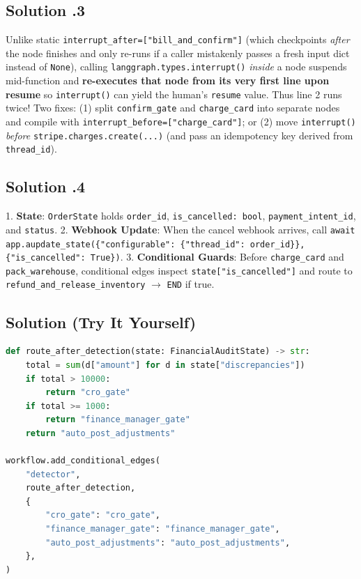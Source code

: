 \subsection*{Solution \thechapter.3}
Unlike static \texttt{interrupt\_after=["bill\_and\_confirm"]} (which checkpoints \emph{after} the node finishes and only re-runs if a caller mistakenly passes a fresh input dict instead of \texttt{None}), calling \texttt{langgraph.types.interrupt()} \emph{inside} a node suspends mid-function and \textbf{re-executes that node from its very first line upon resume} so \texttt{interrupt()} can yield the human's \texttt{resume} value. Thus line 2 runs twice! Two fixes: (1) split \texttt{confirm\_gate} and \texttt{charge\_card} into separate nodes and compile with \texttt{interrupt\_before=["charge\_card"]}; or (2) move \texttt{interrupt()} \emph{before} \texttt{stripe.charges.create(...)} (and pass an idempotency key derived from \texttt{thread\_id}).

\subsection*{Solution \thechapter.4}
1. \textbf{State}: \texttt{OrderState} holds \texttt{order\_id}, \texttt{is\_cancelled: bool}, \texttt{payment\_intent\_id}, and \texttt{status}. 2. \textbf{Webhook Update}: When the cancel webhook arrives, call \texttt{await app.aupdate\_state(\{"configurable": \{"thread\_id": order\_id\}\}, \{"is\_cancelled": True\})}. 3. \textbf{Conditional Guards}: Before \texttt{charge\_card} and \texttt{pack\_warehouse}, conditional edges inspect \texttt{state["is\_cancelled"]} and route to \texttt{refund\_and\_release\_inventory} $\to$ \texttt{END} if true.

\subsection*{Solution (Try It Yourself)}
\begin{lstlisting}[language=Python]
def route_after_detection(state: FinancialAuditState) -> str:
    total = sum(d["amount"] for d in state["discrepancies"])
    if total > 10000:
        return "cro_gate"
    if total >= 1000:
        return "finance_manager_gate"
    return "auto_post_adjustments"

workflow.add_conditional_edges(
    "detector",
    route_after_detection,
    {
        "cro_gate": "cro_gate",
        "finance_manager_gate": "finance_manager_gate",
        "auto_post_adjustments": "auto_post_adjustments",
    },
)
\end{lstlisting}

